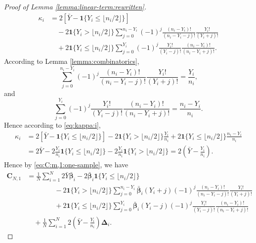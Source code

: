 \documentclass[12pt,letterpaper]{article}
\begin{document}
\begin{proof}[Proof of Lemma \ref{lemma:linear-term:rewritten}]
\begin{equation}\label{eq:kappa:i}
\begin{array}{rl}
\kappa_i\!\!\!\!&=2\left[\bar{Y}-\mathbf{1}\{Y_i\leq\lfloor n_i/2\rfloor\}\right]\\
&\displaystyle\quad-2\mathbf{1}\{Y_i>\lfloor n_i/2\rfloor\}\sum_{j=0}^{n_i-Y_i}(-1)^j\frac{(n_i-Y_i)!}{(n_i-Y_i-j)!}\frac{Y_i!}{(Y_i+j)!}\\
&\displaystyle\quad+2\mathbf{1}\{Y_i\leq\lfloor n_i/2\rfloor\}\sum_{j=0}^{Y_i}(-1)^j\frac{Y_i!}{(Y_i-j)!}\frac{(n_i-Y_i)!}{(n_i-Y_i+j)!}.
\end{array}
\end{equation}
According to Lemma \ref{lemma:combinatorics},
$$\sum_{j=0}^{n_i-Y_i}(-1)^j\frac{(n_i-Y_i)!}{(n_i-Y_i-j)!}\frac{Y_i!}{(Y_i+j)!}=\frac{Y_i}{n_i},$$
and
$$\sum_{j=0}^{Y_i}(-1)^j\frac{Y_i!}{(Y_i-j)!}\frac{(n_i-Y_i)!}{(n_i-Y_i+j)!}=\frac{n_i-Y_i}{n_i}.$$
Hence according to \eqref{eq:kappa:i},
\begin{equation}\label{eq:kappa:i:new}
\begin{array}{rl}
    \kappa_i\!\!\!\!&\displaystyle=2\left[\bar{Y}-\mathbf{1}\{Y_i\leq\lfloor n_i/2\rfloor\}\right]-2\mathbf{1}\{Y_i>\lfloor n_i/2\rfloor\}\frac{Y_i}{n_i}+2\mathbf{1}\{Y_i\leq\lfloor n_i/2\rfloor\}\frac{n_i-Y_i}{n_i}\\
    &\displaystyle=2\bar{Y}-2\frac{Y_i}{n_i}\mathbf{1}\{Y_i\leq\lfloor n_i/2\rfloor\}-2\frac{Y_i}{n_i}\mathbf{1}\{Y_i>\lfloor n_i/2\rfloor\}=2\left(\bar{Y}-\frac{Y_i}{n_i}\right).
\end{array}
\end{equation}
Hence by \eqref{eq:C:m,1:one-sample}, we have 
\begin{equation}\label{eq:C:m,1:one-sample:expand}
\begin{array}{rl}
\mathbf{C}_{N,1}\!\!\!\!\!\!&\displaystyle=\frac{1}{N}\sum_{i=1}^N2\bar{Y}\boldsymbol{\bar{\beta}}_i-2\bar{\boldsymbol{\beta}}_i\mathbf{1}\{Y_i\leq\lfloor n_i/2\rfloor\}\\
&\displaystyle\quad\quad\quad\quad-2\mathbf{1}\{Y_i>\lfloor n_i/2\rfloor\}\sum_{j=0}^{n_i-Y_i}\boldsymbol{\bar{\beta}}_i(Y_i+j)(-1)^j\frac{(n_i-Y_i)!}{(n_i-Y_i-j)!}\frac{Y_i!}{(Y_i+j)!}\\
&\displaystyle\quad\quad\quad\quad+2\mathbf{1}\{Y_i\leq\lfloor n_i/2\rfloor\}\sum_{j=0}^{Y_i}\boldsymbol{\bar{\beta}}_i(Y_i-j)(-1)^j\frac{Y_i!}{(Y_i-j)!}\frac{(n_i-Y_i)!}{(n_i-Y_i+j)!}\\
&\quad\displaystyle+\frac{1}{N}\sum_{i=1}^N2\left(\bar{Y}-\frac{Y_i}{n_i}\right)\mathbf{\Delta}_i.

\end{array}
\end{equation}
\end{proof}
\end{document}
